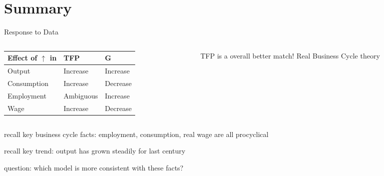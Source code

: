 \documentclass[11pt,aspectratio=169,usenames,dvipsnames]{beamer}
\let\tempone\itemize
\let\temptwo\enditemize
\renewenvironment{itemize}{\tempone\addtolength{\itemsep}{\fill}}{\temptwo}
\begin{document}
\section{Summary}
\label{sec:Summary}

\begin{frame}{Response to Data}
\label{slide:Response_to_Data}
    \begin{columns}
        \begin{column}{0.7\textwidth}
            \begin{tabular}{l|l|l}
                Effect of $\uparrow$ in & TFP       & G        \\
                \hline
                \hline
                Output                  & Increase  & Increase \\
                \hline
                Consumption             & Increase  & Decrease \\
                \hline
                Employment              & Ambiguous & Increase \\
                \hline
                Wage                    & Increase  & Decrease
            \end{tabular}
        \end{column}
        \begin{column}{0.3\textwidth}
            TFP is a overall better match!
            \alert{Real Business Cycle} theory
        \end{column}
    \end{columns}
    \begin{itemize}
        \item recall key \alert{business cycle facts}: employment, consumption, real wage are all procyclical
        \item recall key \alert{trend}: output has grown steadily for last century
        \item question: which model is more consistent with these facts?
    \end{itemize}
\end{frame}
\end{document}
